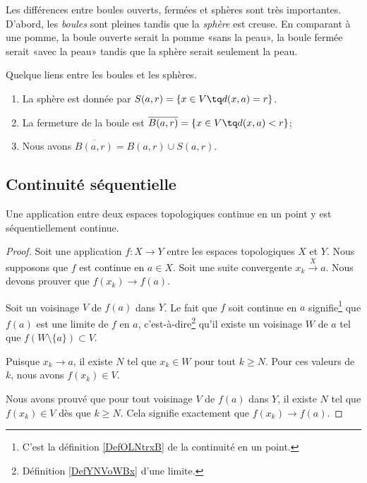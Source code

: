 \begin{normaltext}
	Les différences entre boules ouverts, fermées et sphères sont très importantes. D'abord, les \emph{boules} sont pleines tandis que la \emph{sphère} est creuse. En comparant à une pomme, la boule ouverte serait la pomme «sans la peau», la boule fermée serait «avec la peau» tandis que la sphère serait seulement la peau.
\end{normaltext}

\begin{lemma}       \label{LEMooDYYYooHZitMZ}
	Quelque liens entre les boules et les sphères.
	\begin{enumerate}
		\item
		      La sphère est donnée par \( S(a,r)=\{ x\in V\tq d(x,a)=r \}\).
		\item
		      La fermeture de la boule est \( \overline{ B(a,r) }=\{ x\in V\tq d(x,a)<r \}\);
		\item
		      Nous avons \( \overline{ B(a,r) }=B(a,r)\cup S(a,r)\).
	\end{enumerate}
\end{lemma}

\subsection{Continuité séquentielle}

\begin{corollary}		\label{PropFnContParSuite}
	Une application entre deux espaces topologiques continue en un point y est séquentiellement continue.
\end{corollary}

\begin{proof}
	Soit une application \( f\colon X\to Y\) entre les espaces topologiques \( X\) et \( Y\). Nous supposons que \( f\) est continue en \( a\in X\). Soit une suite convergente \( x_k\stackrel{X}{\longrightarrow}a\). Nous devons prouver que \( f(x_k)\to f(a)\).

	Soit un voisinage \( V\) de \( f(a)\) dans \( Y\). Le fait que \( f\) soit continue en \( a\) signifie\footnote{C'est la définition \ref{DefOLNtrxB} de la continuité en un point.} que \( f(a)\) est une limite de \( f\) en \( a\), c'est-à-dire\footnote{Définition \ref{DefYNVoWBx} d'une limite.} qu'il existe un voisinage \( W\) de \( a\) tel que \( f(W\setminus\{ a \})\subset V\).

	Puisque \( x_k\to a\), il existe \( N\) tel que \( x_k\in W\) pour tout \( k\geq N\). Pour ces valeurs de \( k\), nous avons \( f(x_k)\in V\).

	Nous avons prouvé que pour tout voisinage \( V\) de \( f(a)\) dans \( Y\), il existe \( N\) tel que \( f(x_k)\in V\) dès que \( k\geq N\). Cela signifie exactement que \( f(x_k)\to f(a)\).
\end{proof}

